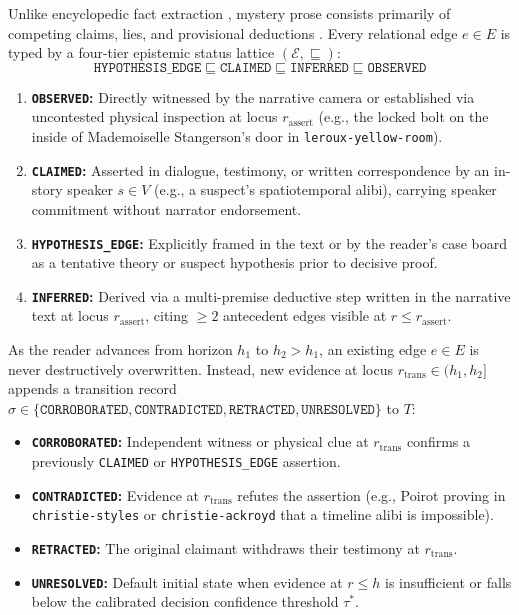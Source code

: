 \documentclass[11pt,twocolumn]{article}
\begin{document}
Unlike encyclopedic fact extraction \citep{thorne2018fever}, mystery prose consists primarily of competing claims, lies, and provisional deductions \citep{w3c2013provo}. Every relational edge $e \in E$ is typed by a four-tier epistemic status lattice $(\mathcal{E}, \sqsubseteq)$:
\begin{equation}
\texttt{HYPOTHESIS\_EDGE} \sqsubseteq \texttt{CLAIMED} \sqsubseteq \texttt{INFERRED} \sqsubseteq \texttt{OBSERVED}
\label{eq:epistemic_lattice}
\end{equation}
\begin{enumerate}
  \item \textbf{\texttt{OBSERVED}:} Directly witnessed by the narrative camera or established via uncontested physical inspection at locus $r_{\text{assert}}$ (e.g., the locked bolt on the inside of Mademoiselle Stangerson's door in \texttt{leroux-yellow-room}).
  \item \textbf{\texttt{CLAIMED}:} Asserted in dialogue, testimony, or written correspondence by an in-story speaker $s \in V$ (e.g., a suspect's spatiotemporal alibi), carrying speaker commitment without narrator endorsement.
  \item \textbf{\texttt{HYPOTHESIS\_EDGE}:} Explicitly framed in the text or by the reader's case board as a tentative theory or suspect hypothesis prior to decisive proof.
  \item \textbf{\texttt{INFERRED}:} Derived via a multi-premise deductive step written in the narrative text at locus $r_{\text{assert}}$, citing $\ge 2$ antecedent edges visible at $r \le r_{\text{assert}}$.
\end{enumerate}

As the reader advances from horizon $h_1$ to $h_2 > h_1$, an existing edge $e \in E$ is never destructively overwritten. Instead, new evidence at locus $r_{\text{trans}} \in (h_1, h_2]$ appends a transition record $\sigma \in \{\texttt{CORROBORATED}, \texttt{CONTRADICTED}, \texttt{RETRACTED}, \texttt{UNRESOLVED}\}$ to $T$:
\begin{itemize}
  \item \textbf{\texttt{CORROBORATED}:} Independent witness or physical clue at $r_{\text{trans}}$ confirms a previously \texttt{CLAIMED} or \texttt{HYPOTHESIS\_EDGE} assertion.
  \item \textbf{\texttt{CONTRADICTED}:} Evidence at $r_{\text{trans}}$ refutes the assertion (e.g., Poirot proving in \texttt{christie-styles} or \texttt{christie-ackroyd} that a timeline alibi is impossible).
  \item \textbf{\texttt{RETRACTED}:} The original claimant withdraws their testimony at $r_{\text{trans}}$.
  \item \textbf{\texttt{UNRESOLVED}:} Default initial state when evidence at $r \le h$ is insufficient or falls below the calibrated decision confidence threshold $\tau^*$.
\end{itemize}
\end{document}

